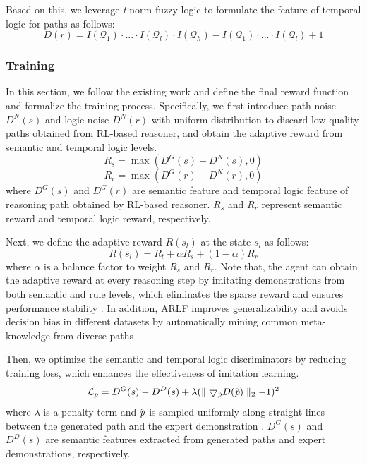 \documentclass[sigconf,natbib=true]{acmart}
\begin{document}
Based on this, we leverage \emph{t}-norm fuzzy logic to formulate the feature of temporal logic for  paths as follows:
 \begin{equation}
	D(r) = I(\mathcal{Q}_1)\cdot...\cdot I(\mathcal{Q}_l) \cdot I(\mathcal{Q}_h) - I(\mathcal{Q}_1) \cdot...\cdot I(\mathcal{Q}_l)+1 
\end{equation}


\subsubsection{Training}
In this section, we follow the existing work \cite{RIDIVINE} and define the final reward function and formalize the training process. Specifically, we first introduce path noise $D^N(s)$ and logic noise $D^N(r)$ with uniform distribution to discard low-quality paths obtained from RL-based reasoner, and obtain the adaptive reward from semantic and temporal logic levels. 
 \begin{equation}
	R_s = \max(D^G(s) - D^N(s), 0)
\end{equation}
 \begin{equation}
	R_r = \max(D^G(r) - D^N(r), 0)
\end{equation}
where $D^G(s)$ and $D^G(r)$ are semantic feature and temporal logic feature of reasoning path obtained by RL-based reasoner. $R_s$ and $R_r$ represent semantic reward and temporal logic reward, respectively.

Next, we define the adaptive reward $R(s_l)$ at the state $s_l$ as follows:
 \begin{equation}
	R(s_l) = R_t+\alpha R_s + (1-\alpha) R_r
\end{equation}
where $\alpha$ is a balance factor to weight $R_s$ and $R_r$. Note that, the agent can obtain the adaptive reward at every reasoning step by imitating demonstrations from both semantic and rule levels, which eliminates the sparse reward and ensures performance stability \cite{IRL}. In addition, ARLF improves generalizability and avoids decision bias in different datasets by automatically mining common meta-knowledge from diverse  paths \cite{RLbalan}.


Then, we optimize the semantic and temporal logic discriminators by reducing training loss, which enhances the effectiveness of imitation learning. %
 \begin{equation}
	\mathcal{L}_p = D^G(s) - D^D(s)+ \lambda (\parallel \bigtriangledown_{\hat{\emph{p}}}D(\hat{\emph{p}})\parallel_{2} -1)^{2}
\end{equation}
where $\lambda$ is a penalty term and $\hat{\emph{p}}$ is sampled uniformly along straight lines between the generated path and the expert demonstration \cite{RIDIVINE}. $D^G(s)$ and $D^D(s)$ are semantic features  extracted from generated paths and expert demonstrations, respectively.
\end{document}
